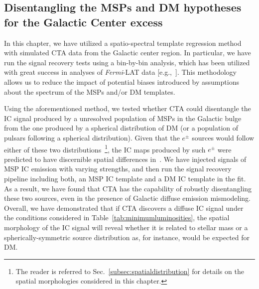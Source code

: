 \documentclass[doublespace,nopageskip]{VTthesis} %
\begin{document}
\subsection{Disentangling the MSPs and DM hypotheses for the Galactic Center excess}
\label{subsec:disentanglingMSPsfromDM}

In this chapter, we have utilized a spatio-spectral template regression method with simulated CTA data from the Galactic center region. In particular, we have run the signal recovery tests using a bin-by-bin analysis, which has been utilized with great success in analyses of \textit{Fermi}-LAT data [e.g.,~\citep{2015PhRvL.115w1301A,2017ApJ...840...43A}]. This methodology allows us to reduce the impact of potential biases introduced by assumptions about the spectrum of the MSPs and/or DM templates.
 

Using the aforementioned method, we tested whether CTA could disentangle the IC signal produced by a unresolved population of MSPs in the Galactic bulge from the one produced by a spherical distribution of DM (or a population of pulsars following a spherical distribution). Given that the $e^\pm$ sources would follow either of these two distributions~\footnote{The reader is referred to Sec.~\ref{subsec:spatialdistribution} for details on the spatial morphologies considered in this chapter.}, the IC maps produced by such $e^\pm$ were predicted to have discernible spatial differences in~\cite{2019PhRvD..99l3020S}. We have injected signals of MSP IC emission with varying strengths, and then run the signal recovery pipeline including both, an MSP IC template and a DM IC template in the fit. As a result, we have found that CTA has the capability of robustly disentangling these two sources, even in the presence of Galactic diffuse emission mismodeling. Overall, we have demonstrated that if CTA discovers a diffuse IC signal under the conditions considered in Table~\ref{tab:minimumluminosities}, the spatial morphology of the IC signal will reveal whether it is related to stellar mass or a spherically-symmetric source distribution as, for instance, would be expected for DM.
\end{document}
